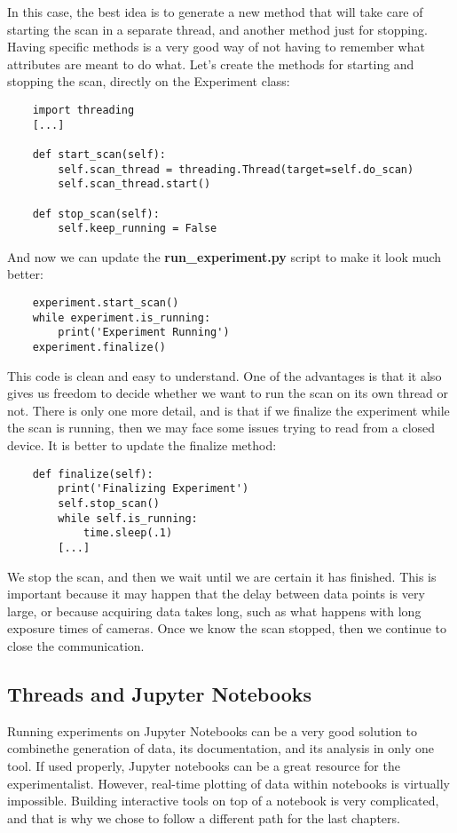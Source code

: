 In this case, the best idea is to generate a new method that will take care of starting the scan in a separate thread, and another method just for stopping. Having specific methods is a very good way of not having to remember what attributes are meant to do what. Let's create the methods for starting and stopping the scan, directly on the Experiment class:

\begin{verbatim}
    import threading
    [...]

    def start_scan(self):
        self.scan_thread = threading.Thread(target=self.do_scan)
        self.scan_thread.start()

    def stop_scan(self):
        self.keep_running = False
\end{verbatim}

And now we can update the \textbf{run\_experiment.py} script to make it look much better:

\begin{verbatim}
    experiment.start_scan()
    while experiment.is_running:
        print('Experiment Running')
    experiment.finalize()
\end{verbatim}

This code is clean and easy to understand. One of the advantages is that it also gives us freedom to decide whether we want to run the scan on its own thread or not. There is only one more detail, and is that if we finalize the experiment while the scan is running, then we may face some issues trying to read from a closed device. It is better to update the finalize method:

\begin{verbatim}
    def finalize(self):
        print('Finalizing Experiment')
        self.stop_scan()
        while self.is_running:
            time.sleep(.1)
        [...]
\end{verbatim}

We stop the scan, and then we wait until we are certain it has finished. This is important because it may happen that the delay between data points is very large, or because acquiring data takes long, such as what happens with long exposure times of cameras. Once we know the scan stopped, then we continue to close the communication.

\subsection{Threads and Jupyter Notebooks}\label{subsection:Jupyter}
Running experiments on Jupyter Notebooks can be a very good solution to combinethe generation of data, its documentation, and its analysis in only one tool. If used properly, Jupyter notebooks can be a great resource for the experimentalist. However, real-time plotting of data within notebooks is virtually impossible. Building interactive tools on top of a notebook is very complicated, and that is why we chose to follow a different path for the last chapters.

